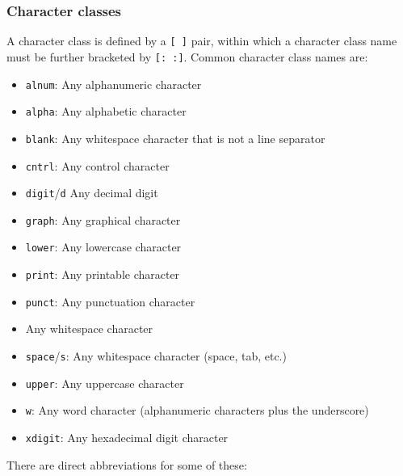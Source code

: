 \documentclass[table, xcdraw]{article}%
\begin{document}
\subsubsection{Character classes}

A character class is defined by a \texttt{[ ]} pair, within which a character class name must be further bracketed by \texttt{[: :]}. Common character class names are:

\begin{itemize}
    \item \texttt{alnum}: Any alphanumeric character
    \item \texttt{alpha}: Any alphabetic character
    \item \texttt{blank}: Any whitespace character that is not a line separator
    \item \texttt{cntrl}: Any control character
    \item \texttt{digit}/\texttt{d} Any decimal digit
    \item \texttt{graph}: Any graphical character
    \item \texttt{lower}: Any lowercase character
    \item \texttt{print}: Any printable character
    \item \texttt{punct}: Any punctuation character
    \item  Any whitespace character
    \item \texttt{space}/\texttt{s}: Any whitespace character (space, tab, etc.)
    \item \texttt{upper}: Any uppercase character
    \item \texttt{w}: Any word character (alphanumeric characters plus the underscore)
    \item \texttt{xdigit}: Any hexadecimal digit character
\end{itemize}

There are direct abbreviations for some of these:
\end{document}

